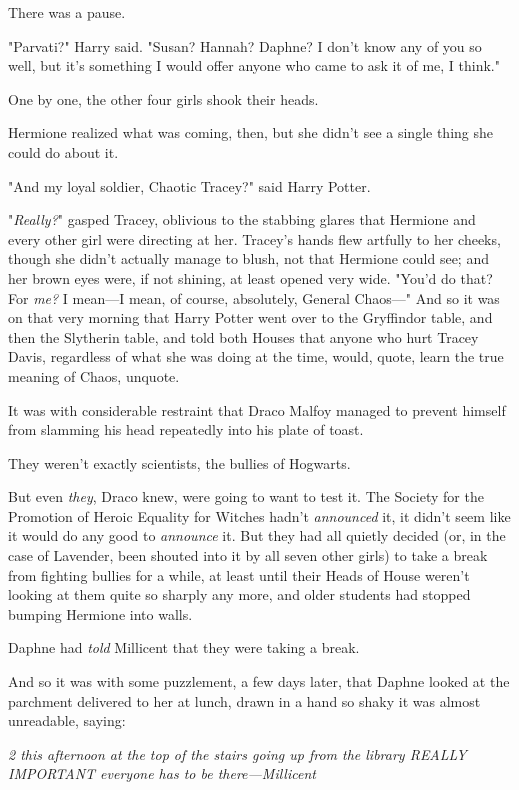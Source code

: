 There was a pause.

"Parvati?" Harry said. "Susan? Hannah? Daphne? I don't know any of you so well,
but it's something I would offer anyone who came to ask it of me, I think."

One by one, the other four girls shook their heads.

Hermione realized what was coming, then, but she didn't see a single thing she
could do about it.

"And my loyal soldier, Chaotic Tracey?" said Harry Potter.

"\emph{Really?}" gasped Tracey, oblivious to the stabbing glares that Hermione
and every other girl were directing at her. Tracey's hands flew artfully to her
cheeks, though she didn't actually manage to blush, not that Hermione could
see; and her brown eyes were, if not shining, at least opened very wide. "You'd
do that? For \emph{me?} I mean---I mean, of course, absolutely, General
Chaos---"
\later
And so it was on that very morning that Harry Potter went over to the
Gryffindor table, and then the Slytherin table, and told both Houses that
anyone who hurt Tracey Davis, regardless of what she was doing at the time,
would, quote, learn the true meaning of Chaos, unquote.

It was with considerable restraint that Draco Malfoy managed to prevent himself
from slamming his head repeatedly into his plate of toast.

They weren't exactly scientists, the bullies of Hogwarts.

But even \emph{they}, Draco knew, were going to want to test it.
\later
The Society for the Promotion of Heroic Equality for Witches hadn't
\emph{announced} it, it didn't seem like it would do any good to
\emph{announce} it. But they had all quietly decided (or, in the case of
Lavender, been shouted into it by all seven other girls) to take a break from
fighting bullies for a while, at least until their Heads of House weren't
looking at them quite so sharply any more, and older students had stopped
bumping Hermione into walls.

Daphne had \emph{told} Millicent that they were taking a break.

And so it was with some puzzlement, a few days later, that Daphne looked at the
parchment delivered to her at lunch, drawn in a hand so shaky it was almost
unreadable, saying:

\emph{2 this afternoon at the top of the stairs going up from the library
REALLY IMPORTANT everyone has to be there---Millicent}

